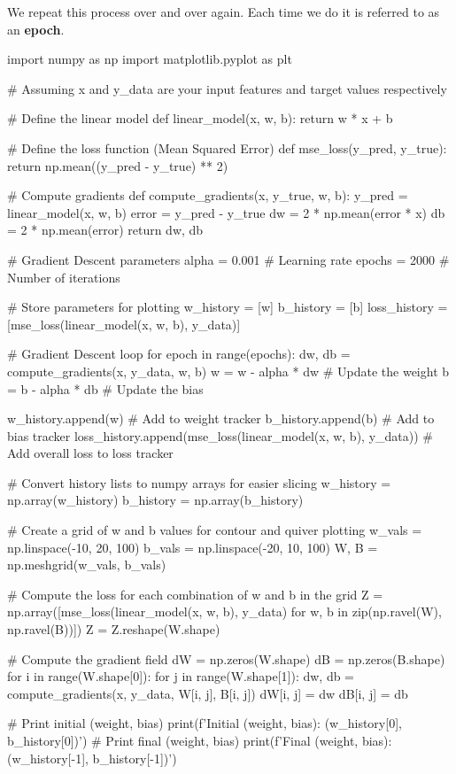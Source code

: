 We repeat this process over and over again. Each time we do it is referred to as an \textbf{epoch}. 

\begin{codeblock}
import numpy as np
import matplotlib.pyplot as plt

# Assuming x and y_data are your input features and target values respectively

# Define the linear model
def linear_model(x, w, b):
    return w * x + b

# Define the loss function (Mean Squared Error)
def mse_loss(y_pred, y_true):
    return np.mean((y_pred - y_true) ** 2)

# Compute gradients
def compute_gradients(x, y_true, w, b):
    y_pred = linear_model(x, w, b)
    error = y_pred - y_true
    dw = 2 * np.mean(error * x)
    db = 2 * np.mean(error)
    return dw, db

# Gradient Descent parameters
alpha = 0.001  # Learning rate
epochs = 2000  # Number of iterations

# Store parameters for plotting
w_history = [w]
b_history = [b]
loss_history = [mse_loss(linear_model(x, w, b), y_data)]

# Gradient Descent loop
for epoch in range(epochs):
    dw, db = compute_gradients(x, y_data, w, b) 
    w = w - alpha * dw # Update the weight
    b = b - alpha * db # Update the bias

    w_history.append(w) # Add to weight tracker
    b_history.append(b) # Add to bias tracker
    loss_history.append(mse_loss(linear_model(x, w, b), y_data)) # Add overall loss to loss tracker

# Convert history lists to numpy arrays for easier slicing
w_history = np.array(w_history)
b_history = np.array(b_history)

# Create a grid of w and b values for contour and quiver plotting
w_vals = np.linspace(-10, 20, 100)
b_vals = np.linspace(-20, 10, 100)
W, B = np.meshgrid(w_vals, b_vals)

# Compute the loss for each combination of w and b in the grid
Z = np.array([mse_loss(linear_model(x, w, b), y_data) for w, b in zip(np.ravel(W), np.ravel(B))])
Z = Z.reshape(W.shape)

# Compute the gradient field
dW = np.zeros(W.shape)
dB = np.zeros(B.shape)
for i in range(W.shape[0]):
    for j in range(W.shape[1]):
        dw, db = compute_gradients(x, y_data, W[i, j], B[i, j])
        dW[i, j] = dw
        dB[i, j] = db

# Print initial (weight, bias)
print(f'Initial (weight, bias): ({w_history[0]}, {b_history[0]})')
# Print final (weight, bias)
print(f'Final (weight, bias): ({w_history[-1]}, {b_history[-1]})')


\end{codeblock}
